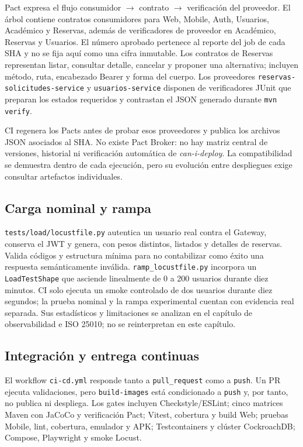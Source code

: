 Pact expresa el flujo consumidor $\rightarrow$ contrato $\rightarrow$
verificación del proveedor. El árbol contiene contratos consumidores para Web,
Mobile, Auth, Usuarios, Académico y Reservas, además de verificadores de
proveedor en Académico, Reservas y Usuarios. El número aprobado pertenece al
reporte del job de cada SHA y no se fija aquí como una cifra inmutable. Los contratos de
Reservas representan listar, consultar detalle, cancelar y proponer una
alternativa; incluyen método, ruta, encabezado Bearer y forma del cuerpo. Los
proveedores \texttt{reservas-solicitudes-service} y
\texttt{usuarios-service} disponen de verificadores JUnit que preparan los
estados requeridos y contrastan el JSON generado durante \texttt{mvn verify}.

CI regenera los Pacts antes de probar esos proveedores y publica los archivos
JSON asociados al SHA. No existe Pact Broker: no hay matriz central de versiones,
historial ni verificación automática de \emph{can-i-deploy}. La compatibilidad se
demuestra dentro de cada ejecución, pero su evolución entre despliegues exige
consultar artefactos individuales.

\subsection{Carga nominal y rampa}
\label{subsec:carga-locust}

\texttt{tests/load/locustfile.py} autentica un usuario real contra el Gateway,
conserva el JWT y genera, con pesos distintos, listados y detalles de reservas.
Valida códigos y estructura mínima para no contabilizar como éxito una respuesta
semánticamente inválida. \texttt{ramp\_locustfile.py} incorpora un
\texttt{LoadTestShape} que asciende linealmente de 0 a 200 usuarios durante diez
minutos. CI solo ejecuta un smoke controlado de dos usuarios durante diez
segundos; la prueba nominal y la rampa experimental cuentan con evidencia real
separada. Sus estadísticos y limitaciones se analizan en el capítulo de
observabilidad e ISO 25010; no se reinterpretan en este capítulo.

\subsection{Integración y entrega continuas}
\label{subsec:ci-cd}

El workflow \texttt{ci-cd.yml} responde tanto a \texttt{pull\_request} como a
\texttt{push}. Un PR ejecuta validaciones, pero \texttt{build-images} está
condicionado a \texttt{push} y, por tanto, no publica ni despliega. Los gates
incluyen Checkstyle/ESLint; cinco matrices Maven con JaCoCo y verificación Pact;
Vitest, cobertura y build Web; pruebas Mobile, lint, cobertura, emulador y APK;
Testcontainers y clúster CockroachDB; Compose, Playwright y smoke Locust.

